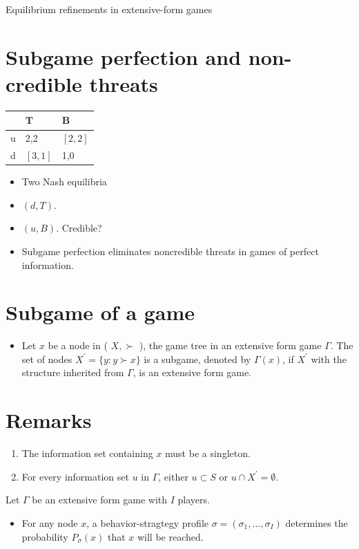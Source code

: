 \documentclass[10pt]{article}
\begin{document}
Equilibrium refinements in extensive-form games

\section*{Subgame perfection and non-credible threats}
\begin{center}
\begin{tabular}{lll}
 & $\mathbf{T}$ & $\mathbf{B}$ \\
\hline
u & 2,2 & $[2,2]$ \\
\hline
d & $[3,1]$ & 1,0 \\
\hline
\end{tabular}
\end{center}

\begin{itemize}
  \item Two Nash equilibria
  \item $(d, T)$.
  \item $(u, B)$. Credible?
  \item Subgame perfection eliminates noncredible threats in games of perfect information.
\end{itemize}

\section*{Subgame of a game}
\begin{itemize}
  \item Let $x$ be a node in ( $X, \succ$ ), the game tree in an extensive form game $\Gamma$. The set of nodes $X^{\prime}=\{y: y \succ x\}$ is a subgame, denoted by $\Gamma(x)$, if $X^{\prime}$ with the structure inherited from $\Gamma$, is an extensive form game.
\end{itemize}

\section*{Remarks}
\begin{enumerate}
  \item The information set containing $x$ must be a singleton.
  \item For every information set $u$ in $\Gamma$, either $u \subset S$ or $u \cap X^{\prime}=\emptyset$.
\end{enumerate}

Let $\Gamma$ be an extensive form game with $I$ players.

\begin{itemize}
  \item For any node $x$, a behavior-stragtegy profile $\sigma=\left(\sigma_{1}, \ldots, \sigma_{I}\right)$ determines the probability $P_{\sigma}(x)$ that $x$ will be reached.
\end{itemize}
\end{document}
